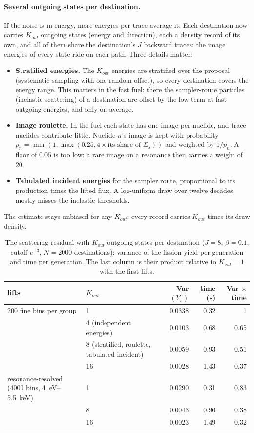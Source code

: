 \paragraph{Several outgoing states per destination.} If the noise is in energy, more energies per
trace average it. Each destination now carries $K_{out}$ outgoing states (energy and direction), each
a density record of its own, and all of them share the destination's $J$ backward traces: the image
energies of every state ride on each path. Three details matter:
\begin{itemize}
\item \textbf{Stratified energies.} The $K_{out}$ energies are stratified over the proposal
  (systematic sampling with one random offset), so every destination covers the energy range. This
  matters in the fast fuel: there the sampler-route particles (inelastic scattering) of a
  destination are offset by the low term at fast outgoing energies, and only on average.
\item \textbf{Image roulette.} In the fuel each state has one image per nuclide, and trace nuclides
  contribute little. Nuclide $n$'s image is kept with probability
  $p_n=\min(1,\max(0.25,4\times\text{its share of }\Sigma_s))$ and weighted by $1/p_n$. A floor of
  $0.05$ is too low: a rare image on a resonance then carries a weight of 20.
\item \textbf{Tabulated incident energies} for the sampler route, proportional to its production
  times the lifted flux. A log-uniform draw over twelve decades mostly misses the inelastic
  thresholds.
\end{itemize}
The estimate stays unbiased for any $K_{out}$: every record carries $K_{out}$ times its draw density.

\begin{table}[t]\centering\small
\caption{The scattering residual with $K_{out}$ outgoing states per destination ($J=8$, $\beta=0.1$,
cutoff $e^{-3}$, $N=2000$ destinations): variance of the fission yield per generation and time per
generation. The last column is their product relative to $K_{out}=1$ with the first lifts.}
\label{tab:lifts:ko}
\begin{tabular}{@{}llrrr@{}}
\toprule
lifts & $K_{out}$ & Var$(Y_s)$ & time (s) & Var $\times$ time\\
\midrule
200 fine bins per group & 1 & 0.0338 & 0.32 & 1\\
 & 4 (independent energies) & 0.0103 & 0.68 & 0.65\\
 & 8 (stratified, roulette, tabulated incident) & 0.0059 & 0.93 & 0.51\\
 & 16 & 0.0028 & 1.43 & 0.37\\
resonance-resolved (4000 bins, 4~eV--5.5~keV) & 1 & 0.0290 & 0.31 & 0.83\\
 & 8 & 0.0043 & 0.96 & 0.38\\
 & 16 & 0.0023 & 1.49 & 0.32\\
\bottomrule
\end{tabular}
\end{table}

